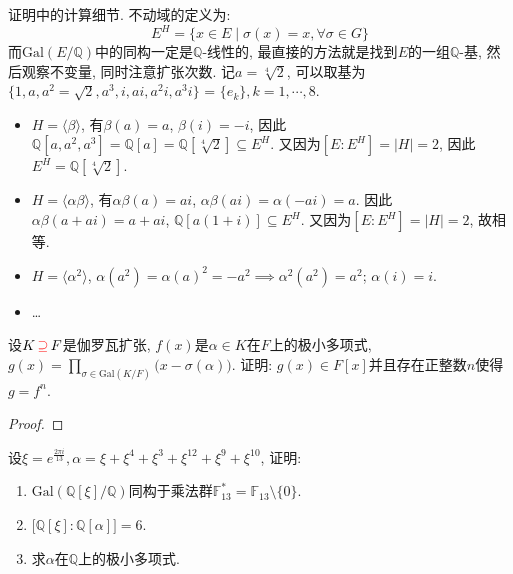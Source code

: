 \begin{remark}
    证明中的计算细节. 不动域的定义为:
    \[
        E^H = \{x \in E \mid \sigma(x) = x, \forall \sigma \in G\}
    \]
    而$\mathrm{Gal}(E/\mathbb{Q})$中的同构一定是$\mathbb{Q}$-线性的, 最直接的方法就是找到$E$的一组$\mathbb{Q}$-基, 然后观察不变量, 同时注意扩张次数. 记$a = \sqrt[4]{2}$, 可以取基为$\{1, a, a^2 = \sqrt{2}, a^3, i, ai, a^2i, a^3i\}$ = $\{e_k\}, k = 1, \cdots, 8$.
    \begin{itemize}
        \item $H = \langle \beta \rangle$, 有$\beta(a) = a$, $\beta(i) = -i$, 因此$\mathbb{Q}[a, a^2, a^3] = \mathbb{Q}[a] = \mathbb{Q}[\sqrt[4]{2}] \subseteq E^H$. 又因为$[E:E^H] = |H| = 2$, 因此$E^H = \mathbb{Q}[\sqrt[4]{2}]$.
        \item $H = \langle \alpha\beta \rangle$, 有$\alpha\beta(a) = ai$, $\alpha\beta(ai) = \alpha(-ai) = a$. 因此$\alpha\beta(a + ai) = a + ai$, $\mathbb{Q}[a(1 + i)] \subseteq E^H$. 又因为$[E:E^H] = |H| = 2$, 故相等.
        \item $H = \langle \alpha^2 \rangle$, $\alpha(a^2) = \alpha(a)^2 = -a^2 \implies \alpha^2(a^2) = a^2$; $\alpha(i) = i$.
        \item \dots
    \end{itemize}
\end{remark}

\begin{problem}
    设$K \,\textcolor{red}{\supseteq}\, F$是伽罗瓦扩张, $f(x)$是$\alpha \in K$在$F$上的极小多项式, \(g(x) = \prod_{\sigma \in \mathrm{Gal}(K/F)} \big(x - \sigma(\alpha) \big).\) 证明: $g(x) \in F[x]$并且存在正整数$n$使得$g = f^n$.
\end{problem}

\begin{proof}
    
\end{proof}

\begin{problem}
    设$\xi = e^{\frac{2\pi i}{13}}, \alpha = \xi + \xi^4 + \xi^3 + \xi^{12} + \xi^9 + \xi^{10}$, 证明: 
    \begin{enumerate}[(1)]
        \item $\mathrm{Gal}\left(\mathbb{Q}[\xi]/\mathbb{Q}\right)$同构于乘法群$\mathbb{F}_{13}^* = \mathbb{F}_{13} \setminus \{0\}$.
        \item $\bigl[\mathbb{Q}[\xi]:\mathbb{Q}[\alpha]\bigr] = 6$.
        \item 求$\alpha$在$\mathbb{Q}$上的极小多项式.
    \end{enumerate}
\end{problem}

